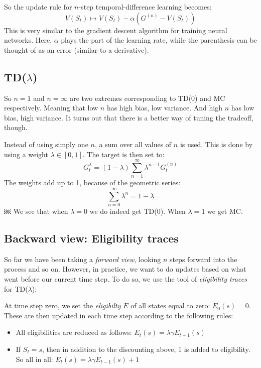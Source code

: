 \documentclass[12pt, a4paper]{article}
\numberwithin{equation}{section}
\begin{document}
So the update rule for $n$-step temporal-difference learning becomes:
\begin{equation}
V(S_t)\mapsto V(S_t)-\alpha(G^{(n)}-V(S_t))
\end{equation}
This is very similar to the gradient descent algorithm for training neural networks. Here, $\alpha$ plays the part of the learning rate, while the parenthesis can be thought of as an error (similar to a derivative).

\subsection{TD($\lambda$)}
So $n=1$ and $n=\infty$ are two extremes corresponding to TD(0) and MC respectively. Meaning that low $n$ has high bias, low variance. And high $n$ has low bias, high variance. It turns out that there is a better way of tuning the tradeoff, though.

Instead of using simply one $n$, a sum over all values of $n$ is used. This is done by using a weight $\lambda\in[0,1]$. The target is then set to:
\begin{equation}
G^\lambda_t=(1-\lambda)\sum_{n=1}^\infty\lambda^{n-1}G^{(n)}_t
\end{equation}
The weights add up to 1, because of the geometric series:
\begin{equation}
\sum_{n=0}^\infty\lambda^n=1-\lambda
\end{equation}￼
We see that when $\lambda=0$ we do indeed get TD(0). When $\lambda=1$ we get MC.

\subsection{Backward view: Eligibility traces}
So far we have been taking a \textit{forward view}, looking $n$ steps forward into the process and so on. However, in practice, we want to do updates based on what went before our current time step. To do so, we use the tool of \textit{eligibility traces} for TD($\lambda$):

At time step zero, we set the \textit{eligibilty} $E$ of all states equal to zero: $E_0(s)=0$. These are then updated in each time step according to the following rules:
\begin{itemize}
\item All eligibilities are reduced as follows: $E_t(s)=\lambda\gamma E_{t-1}(s)$
\item If $S_t=s$, then in addition to the discounting above, 1 is added to eligibility. So all in all: $E_t(s)=\lambda\gamma E_{t-1}(s)+1$
\end{itemize}
\end{document}
